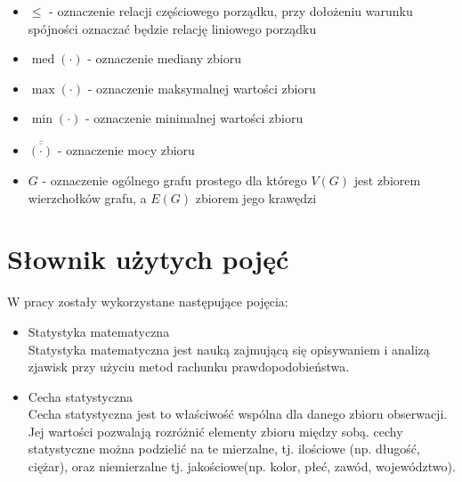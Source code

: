 \documentclass[12pt,a4paper]{report}
\newcommand{\mediana}{\operatorname{med}}
\newcommand{\licznosc}[1]{\overline{\overline{#1}}}
\begin{document}
\begin{itemize}
\item $\leq$ - oznaczenie relacji częściowego porządku, przy dołożeniu warunku spójności oznaczać będzie relację liniowego porządku
\item $\mediana{(\cdot)}$ - oznaczenie mediany zbioru
\item $\max{(\cdot)}$ - oznaczenie maksymalnej wartości zbioru
\item $\min{(\cdot)}$ - oznaczenie minimalnej wartości zbioru
\item $\licznosc{(\cdot)}$ - oznaczenie mocy zbioru
\item $G$ - oznaczenie ogólnego grafu prostego dla którego $V(G)$ jest zbiorem wierzchołków grafu, a $E(G)$ zbiorem jego krawędzi




\end{itemize}


\section{Słownik użytych pojęć}
W pracy zostały wykorzystane następujące pojęcia:
\begin{itemize}
\item Statystyka matematyczna \cite[w oparciu o rozdział 1]{krysicki1999}\\
Statystyka matematyczna jest nauką zajmującą się opisywaniem i analizą zjawisk przy użyciu metod rachunku prawdopodobieństwa. 


 
 
\item Cecha statystyczna \cite[Rozdział 1]{krysicki1999}\\
Cecha statystyczna jest to właściwość wspólna dla danego zbioru obserwacji. Jej wartości pozwalają rozróżnić elementy zbioru między sobą. cechy statystyczne można podzielić na te mierzalne, tj. ilościowe (np. długość, ciężar), oraz niemierzalne tj. jakościowe(np. kolor, płeć, zawód, województwo).

\end{itemize}
\end{document}
